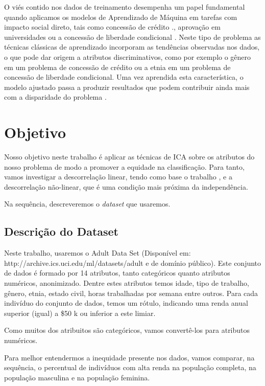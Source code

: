 \documentclass[11pt]{article}
\begin{document}
O viés contido nos dados de treinamento desempenha um papel fundamental
quando aplicamos os modelos de Aprendizado de Máquina em tarefas com
impacto social direto, tais como concessão de crédito \cite{ONeil2016}.,
aprovação em universidades \cite{ONeil2016} ou a concessão de liberdade
condicional \cite{Chouldechova2017}. Neste tipo de problema as técnicas
clássicas de aprendizado incorporam as tendências observadas nos dados,
o que pode dar origem a atributos discriminativos, como por exemplo o
gênero em um problema de concessão de crédito ou a etnia em um problema
de concessão de liberdade condicional. Uma vez aprendida esta
característica, o modelo ajustado passa a produzir resultados que podem
contribuir ainda mais com a disparidade do problema \cite{ONeil2016}.

    \section{Objetivo}\label{objetivo}

Nosso objetivo neste trabalho é aplicar as técnicas de ICA
\cite{Hyvarinen2001} sobre os atributos do nosso problema de modo a
promover a equidade na classificação. Para tanto, vamos investigar a
descorrelação linear, tendo como base o trabalho \cite{Zafar2017}, e a
descorrelação não-linear, que é uma condição mais próxima da
independência.

Na sequência, descreveremos o \emph{dataset} que usaremos.

    \subsection{Descrição do Dataset}\label{descriuxe7uxe3o-do-dataset}

Neste trabalho, usaremos o Adult Data Set (Disponível em:
http://archive.ics.uci.edu/ml/datasets/adult e de domínio público). Este
conjunto de dados é formado por 14 atributos, tanto categóricos quanto
atributos numéricos, anonimizado. Dentre estes atributos temos idade,
tipo de trabalho, gênero, etnia, estado civil, horas trabalhadas por
semana entre outros. Para cada indivíduo do conjunto de dados, temos um
rótulo, indicando uma renda anual superior (igual) a \$50 k ou inferior
a este limiar.

Como muitos dos atribuitos são categóricos, vamos convertê-los para
atributos numéricos.

    Para melhor entendermos a inequidade presente nos dados, vamos comparar,
na sequência, o percentual de indivíduos com alta renda na população
completa, na população masculina e na população feminina.
\end{document}
